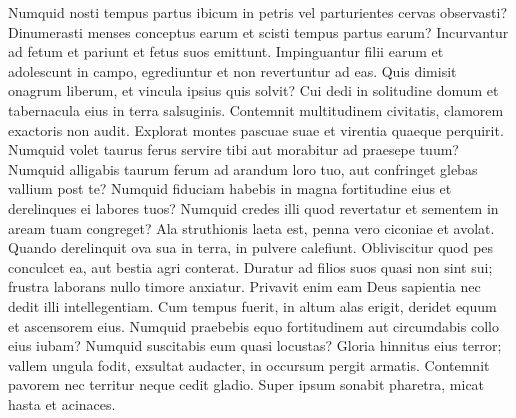 \begin{biblechapter}
\begin{biblechapter}
\begin{biblechapter}
\begin{biblechapter}
\begin{biblechapter}
\begin{biblechapter}
\begin{biblechapter}
\begin{biblechapter}
\begin{biblechapter}
\begin{biblechapter}
\begin{biblechapter}
\begin{biblechapter}
\begin{biblechapter}
\begin{biblechapter}
\begin{biblechapter}
\begin{biblechapter}
\begin{biblechapter}
\begin{biblechapter}
\begin{biblechapter}
\begin{biblechapter}
\begin{biblechapter}
\begin{biblechapter}
\begin{biblechapter}
\begin{biblechapter}
\begin{biblechapter}
\begin{biblechapter}
\begin{biblechapter}
\begin{biblechapter}
\begin{biblechapter}
\begin{biblechapter}
\begin{biblechapter}
\begin{biblechapter}
\begin{biblechapter}
\begin{biblechapter}
\begin{biblechapter}
\begin{biblechapter}
\begin{biblechapter}
\begin{biblechapter}
\begin{biblechapter}
\verse Numquid nosti tempus partus ibicum in petris
 vel parturientes cervas observasti?
 \verse Dinumerasti menses conceptus earum
 et scisti tempus partus earum?
 \verse Incurvantur ad fetum et pariunt
 et fetus suos emittunt.
 \verse Impinguantur filii earum et adolescunt in campo,
 egrediuntur et non revertuntur ad eas.
 \verse Quis dimisit onagrum liberum,
 et vincula ipsius quis solvit?
 \verse Cui dedi in solitudine domum
 et tabernacula eius in terra salsuginis.
 \verse Contemnit multitudinem civitatis,
 clamorem exactoris non audit.
 \verse Explorat montes pascuae suae
 et virentia quaeque perquirit.
 \verse Numquid volet taurus ferus servire tibi
 aut morabitur ad praesepe tuum?
 \verse Numquid alligabis taurum ferum ad arandum loro tuo,
 aut confringet glebas vallium post te?
 \verse Numquid fiduciam habebis in magna fortitudine eius
 et derelinques ei labores tuos?
 \verse Numquid credes illi quod revertatur
 et sementem in aream tuam congreget?
 \verse Ala struthionis laeta est,
 penna vero ciconiae et avolat.
 \verse Quando derelinquit ova sua in terra,
 in pulvere calefiunt.
 \verse Obliviscitur quod pes conculcet ea,
 aut bestia agri conterat.
 \verse Duratur ad filios suos quasi non sint sui;
 frustra laborans nullo timore anxiatur.
 \verse Privavit enim eam Deus sapientia
 nec dedit illi intellegentiam.
 \verse Cum tempus fuerit, in altum alas erigit,
 deridet equum et ascensorem eius.
 \verse Numquid praebebis equo fortitudinem
 aut circumdabis collo eius iubam?
 \verse Numquid suscitabis eum quasi locustas?
 Gloria hinnitus eius terror;
 \verse vallem ungula fodit, exsultat audacter,
 in occursum pergit armatis.
 \verse Contemnit pavorem nec territur
 neque cedit gladio.
 \verse Super ipsum sonabit pharetra,
 micat hasta et acinaces.

\end{biblechapter}
\end{biblechapter}
\end{biblechapter}
\end{biblechapter}
\end{biblechapter}
\end{biblechapter}
\end{biblechapter}
\end{biblechapter}
\end{biblechapter}
\end{biblechapter}
\end{biblechapter}
\end{biblechapter}
\end{biblechapter}
\end{biblechapter}
\end{biblechapter}
\end{biblechapter}
\end{biblechapter}
\end{biblechapter}
\end{biblechapter}
\end{biblechapter}
\end{biblechapter}
\end{biblechapter}
\end{biblechapter}
\end{biblechapter}
\end{biblechapter}
\end{biblechapter}
\end{biblechapter}
\end{biblechapter}
\end{biblechapter}
\end{biblechapter}
\end{biblechapter}
\end{biblechapter}
\end{biblechapter}
\end{biblechapter}
\end{biblechapter}
\end{biblechapter}
\end{biblechapter}
\end{biblechapter}
\end{biblechapter}
